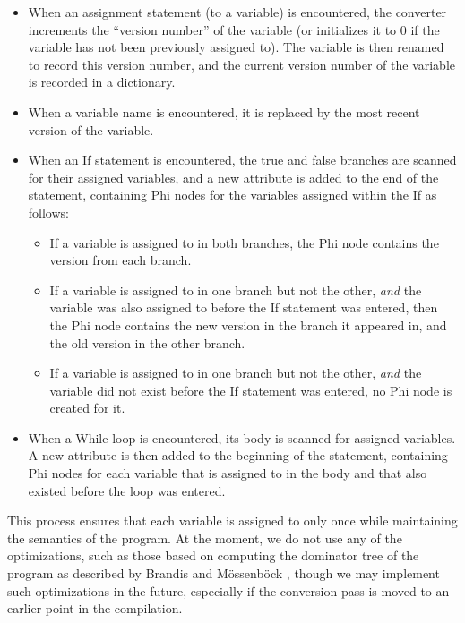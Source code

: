 \documentclass[11pt]{article}
\begin{document}
\begin{itemize}
\item When an assignment statement (to a variable) is encountered, the
  converter increments the ``version number'' of the variable (or
  initializes it to $0$ if the variable has not been previously
  assigned to). The variable is then renamed to record this version
  number, and the current version number of the variable is recorded
  in a dictionary.
\item When a variable name is encountered, it is replaced by the most
  recent version of the variable.
\item When an If statement is encountered, the true and false branches
  are scanned for their assigned variables, and a new attribute is
  added to the end of the statement, containing Phi nodes for the
  variables assigned within the If as follows:
  \begin{itemize}
  \item If a variable is assigned to in both branches, the Phi node
    contains the version from each branch.
  \item If a variable is assigned to in one branch but not the other,
    \textit{and} the variable was also assigned to before the If
    statement was entered, then the Phi node contains the new version
    in the branch it appeared in, and the old version in the other
    branch.
  \item If a variable is assigned to in one branch but not the other,
    \textit{and} the variable did not exist before the If
    statement was entered, no Phi node is created for it.
  \end{itemize}
\item When a While loop is encountered, its body is scanned for
  assigned variables. A new attribute is then added to the beginning
  of the statement, containing Phi nodes for each variable that is
  assigned to in the body and that also existed before the loop was
  entered.
\end{itemize}

This process ensures that each variable is assigned to only once while
maintaining the semantics of the program. At the moment, we do not use
any of the optimizations, such as those based on computing the
dominator tree of the program as described by Brandis and
M\"{o}ssenb\"{ock} \cite{brandis-mossenbock}, though we may implement such
optimizations in the future, especially if the conversion pass is
moved to an earlier point in the compilation.
\end{document}

